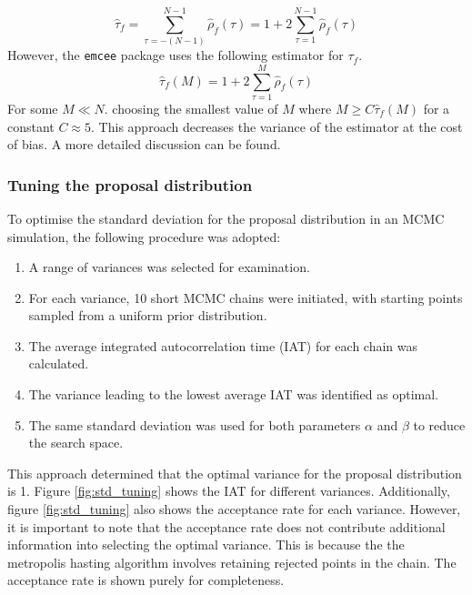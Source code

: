 \documentclass[11pt]{article}
\begin{document}
\begin{equation}
\hat{\tau}_f = \sum_{\tau=-(N-1)}^{N-1} \hat{\rho}_f(\tau) = 1 + 2 \sum_{\tau=1}^{N-1} \hat{\rho}_f(\tau)
\end{equation}
However, the \texttt{emcee} package uses the following estimator for \(\tau_f\). 
\begin{equation}
\hat{\tau}_f(M) = 1 + 2 \sum_{\tau=1}^{M} \hat{\rho}_f(\tau)
\end{equation}
For some \(M \ll N\).  choosing the smallest value of \(M\) where \(M \ge C \hat{\tau}_f(M)\) for a constant \(C \approx 5\). This approach decreases the variance of the estimator at the cost of bias. A more detailed discussion can be found.

\subsubsection{Tuning the proposal distribution}
To optimise the standard deviation for the proposal distribution in an MCMC simulation, the following procedure was adopted:
\begin{enumerate}
    \item A range of variances was selected for examination.
    \item For each variance, 10 short MCMC chains were initiated, with starting points sampled from a uniform prior distribution.
    \item The average integrated autocorrelation time (IAT) for each chain was calculated.
    \item The variance leading to the lowest average IAT was identified as optimal.
    \item The same standard deviation was used for both parameters $\alpha$ and $\beta$ to reduce the search space.
\end{enumerate}

This approach determined that the optimal variance for the proposal distribution is 1. Figure \ref{fig:std_tuning} shows the IAT for different variances. Additionally, figure \ref{fig:std_tuning} also shows the acceptance rate for each variance. However, it is important to note that the acceptance rate does not contribute additional information into selecting the optimal variance. This is because the the metropolis hasting algorithm involves retaining rejected points in the chain. The acceptance rate is shown purely for completeness.
\end{document}
